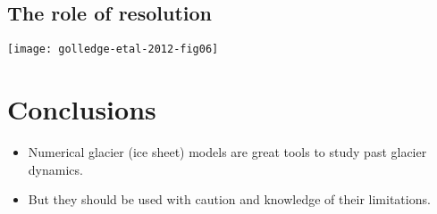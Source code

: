 \documentclass{beamer}
\newcommand{\footlineextra}[1]{\gdef\insertfootlineextra{#1}}
\begin{document}
\subsection{The role of resolution}

\begin{frame}{\insertsubsection}
	\texttt{[image: golledge-etal-2012-fig06]}
	\footlineextra{Source: Golledge et al. 2012}
\end{frame}

\section*{Conclusions}

\begin{frame}{\insertsection}
	\begin{itemize}
		\item Numerical glacier (ice sheet) models are great tools to study past glacier dynamics.
		\item But they should be used with caution and knowledge of their limitations.
	\end{itemize}
\end{frame}

\end{document}
